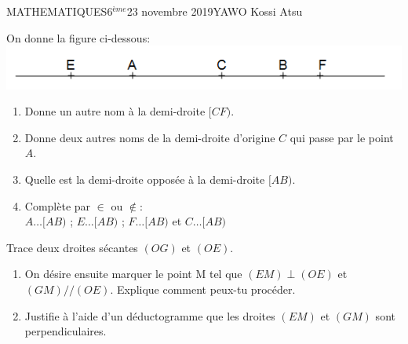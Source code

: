 \documentclass[12pt,a4paper]{book}
\newcommand{\prof}{YAWO Kossi Atsu}
\newcommand{\matiere}{MATHEMATIQUES}
\newcommand{\classe}{6$^{ème}$}
\begin{document}
\begin{td}{\matiere}{\classe}{23 novembre 2019}{\prof}
\vspace{1cm}

\begin{exo}
On donne la figure ci-dessous:\\
\includegraphics[scale=0.9]{images/td1img1.png}
\begin{enumerate}
\item Donne un autre nom à la demi-droite $[CF)$.
\item Donne deux autres noms de la demi-droite d'origine $C$ qui passe par le point $A$.
\item Quelle est la demi-droite opposée à la demi-droite $[AB)$.
\item Complète par $\in$ ou $\notin$:\\
$A \ldots [AB)$ \qquad ; \qquad $E \ldots [AB)$ \qquad ; \qquad $F \ldots [AB)$ \qquad et \qquad $C \ldots [AB)$
\end{enumerate}
\end{exo}

\vspace{1cm}
\begin{exo}
Trace deux droites sécantes $(OG)$ et $(OE)$.
\begin{enumerate}
\item On désire ensuite marquer le point M tel que $(EM) \perp (OE)$ et $(GM)//(OE)$. Explique comment peux-tu procéder.
\item Justifie à l'aide d'un déductogramme que les droites $(EM)$ et $(GM)$ sont perpendiculaires.
\end{enumerate} 
\end{exo}
\end{td}
\end{document}
